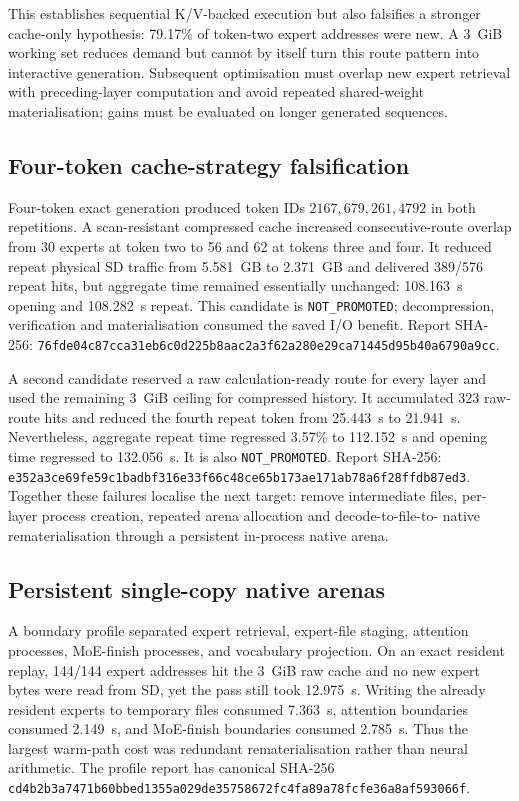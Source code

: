 This establishes sequential K/V-backed execution but also falsifies a stronger
cache-only hypothesis: 79.17\% of token-two expert addresses were new.  A 3~GiB
working set reduces demand but cannot by itself turn this route pattern into
interactive generation.  Subsequent optimisation must overlap new expert
retrieval with preceding-layer computation and avoid repeated shared-weight
materialisation; gains must be evaluated on longer generated sequences.

\subsection{Four-token cache-strategy falsification}
Four-token exact generation produced token IDs
$2167,679,261,4792$ in both repetitions.  A scan-resistant compressed cache
increased consecutive-route overlap from 30 experts at token two to 56 and 62
at tokens three and four.  It reduced repeat physical SD traffic from 5.581~GB
to 2.371~GB and delivered 389/576 repeat hits, but aggregate time remained
essentially unchanged: 108.163~s opening and 108.282~s repeat.  This candidate
is \texttt{NOT\_PROMOTED}; decompression, verification and materialisation
consumed the saved I/O benefit.  Report SHA-256:
\texttt{76fde04c87cca31eb6c0d225b8aac2a3f62a280e29ca71445d95b40a6790a9cc}.

A second candidate reserved a raw calculation-ready route for every layer and
used the remaining 3~GiB ceiling for compressed history.  It accumulated 323
raw-route hits and reduced the fourth repeat token from 25.443~s to 21.941~s.
Nevertheless, aggregate repeat time regressed 3.57\% to 112.152~s and opening
time regressed to 132.056~s.  It is also \texttt{NOT\_PROMOTED}.  Report
SHA-256:
\texttt{e352a3ce69fe59c1badbf316e33f66c48ce65b173ae171ab78a6f28ffdb87ed3}.
Together these failures localise the next target: remove intermediate files,
per-layer process creation, repeated arena allocation and decode-to-file-to-
native rematerialisation through a persistent in-process native arena.

\subsection{Persistent single-copy native arenas}
\label{subsec:gptoss120b-persistent-arenas}
A boundary profile separated expert retrieval, expert-file staging, attention
processes, MoE-finish processes, and vocabulary projection.  On an exact
resident replay, 144/144 expert addresses hit the 3~GiB raw cache and no new
expert bytes were read from SD, yet the pass still took 12.975~s.  Writing the
already resident experts to temporary files consumed 7.363~s, attention
boundaries consumed 2.149~s, and MoE-finish boundaries consumed 2.785~s.
Thus the largest warm-path cost was redundant rematerialisation rather than
neural arithmetic.  The profile report has canonical SHA-256
\texttt{cd4b2b3a7471b60bbed1355a029de35758672fc4fa89a78fcfe36a8af593066f}.

